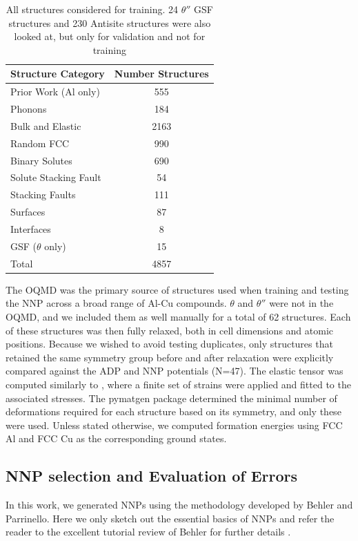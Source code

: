 \documentclass{article}
\begin{document}
\begin{table}[H]
\begin{tabular}{l|c}%
\hline%
Structure Category& Number Structures\\%
\hline%
Prior Work (Al only) &    555 \\
Phonons &    184 \\
Bulk and Elastic  &    2163 \\
Random FCC    & 990 \\
Binary Solutes &     690 \\
Solute Stacking Fault &    54 \\
Stacking Faults &    111 \\
Surfaces &    87 \\
Interfaces &    8 \\
GSF ($\theta$ only)     & 15 \\
\hline
Total &    4857 \\
\end{tabular}%
\caption{All structures considered for training. 24 $\theta''$ GSF structures and 230 Antisite structures were 
also looked at, but only for validation and not for training}
\label{table:included_structures}
\end{table}


The OQMD was the primary source of structures used when training and
testing the NNP across a broad range of Al-Cu compounds. $\theta$ and $\theta''$ were not in the OQMD, and we
included them as well manually for a total of 62 structures. Each of these structures was then fully relaxed, 
both in cell dimensions and atomic positions. Because we wished to avoid testing duplicates, only structures that retained the same symmetry group before and after relaxation were explicitly compared against the ADP and NNP
potentials (N=47). The elastic tensor was computed similarly to \cite{DeJong2015}, where a finite set of strains were
applied and fitted to the associated stresses. The pymatgen package\cite{Ong2013} determined the minimal number of
deformations required for each structure based on its symmetry, and only these were used. 
Unless stated otherwise, we computed formation energies using FCC Al and FCC Cu as the corresponding ground states.

\subsection{NNP selection and Evaluation of Errors}
In this work, we generated NNPs using the methodology developed by Behler and Parrinello\cite{Behler2007}.
Here we only sketch out the essential basics of NNPs and refer the reader to the excellent tutorial review of Behler for further details \cite{Behler2015}. 
\end{document}
